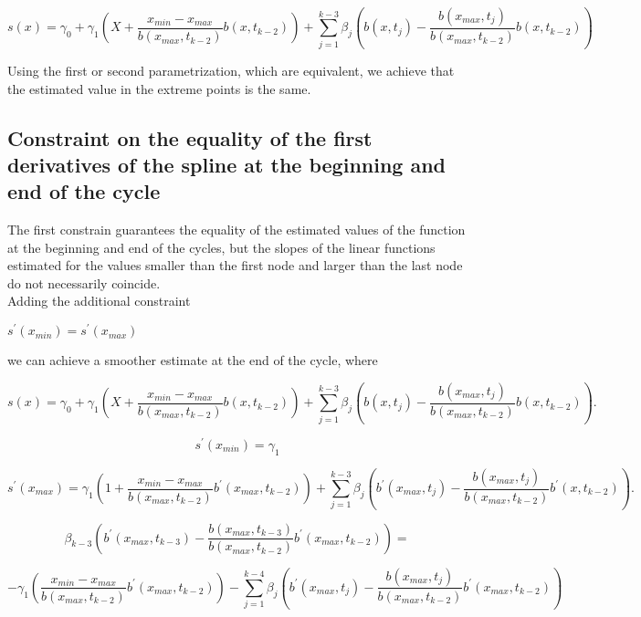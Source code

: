 \documentclass{article}
\begin{document}
$$s(x)=\gamma_0+\gamma_1 \left(X +  \frac{x_{min}-x_{max}}{ b(x_{max}, t_{k-2}) } b(x, t_{k-2}) \right) +  
\sum_{j=1}^{k-3}\beta_j \left(b(x, t_j) -  \frac{b(x_{max}, t_j)}{ b(x_{max}, t_{k-2})} b(x, t_{k-2})\right)$$


Using the first or second parametrization, which are equivalent, we achieve that the estimated value in the extreme points is the same.

\subsection{Constraint on the equality of the first derivatives of the spline at the beginning and end of the cycle}

The first constrain guarantees the equality of the estimated values of the function at the beginning and end of the cycles, but the slopes of the linear functions estimated for the values smaller than the first node and larger than the last node do not necessarily coincide. \\

Adding the additional constraint 

$s^{\prime}(x_{min})=s^{\prime}(x_{max})$

we can achieve a smoother estimate at the end of the cycle, where 


\begin{equation}
\label{s.c0}
s(x)=\gamma_0+\gamma_1 \left(X +  \frac{x_{min}-x_{max}}{ b(x_{max}, t_{k-2}) } b(x, t_{k-2}) \right) +  
\sum_{j=1}^{k-3}\beta_j \left(b(x, t_j) -  \frac{b(x_{max}, t_j)}{ b(x_{max}, t_{k-2})} b(x, t_{k-2})\right).
\end{equation}


$$s^{\prime}(x_{min})=\gamma_1$$


$$s^{\prime}(x_{max})=\gamma_1 \left(1+\frac{x_{min}-x_{max}}{ b(x_{max}, t_{k-2}) } b^{\prime}(x_{max}, t_{k-2}) \right) +  
\sum_{j=1}^{k-3}\beta_j \left(b^{\prime}(x_{max}, t_j) -  \frac{b(x_{max}, t_j)}{ b(x_{max}, t_{k-2})} b^{\prime}(x, t_{k-2})\right).$$




$$ \beta_{k-3} \left(b^{\prime}(x_{max}, t_{k-3}) -  \frac{b(x_{max}, t_{k-3})}{ b(x_{max}, t_{k-2})} b^{\prime}(x_{max}, t_{k-2})\right)=$$ 

$$-\gamma_1 \left(\frac{x_{min}-x_{max}}{ b(x_{max}, t_{k-2}) }   b^{\prime}(x_{max}, t_{k-2}) \right) -
\sum_{j=1}^{k-4}\beta_j \left(b^{\prime}(x_{max}, t_j) -  \frac{b(x_{max}, t_j)}{ b(x_{max}, t_{k-2})} b^{\prime}(x_{max}, t_{k-2})\right) $$
\end{document}
